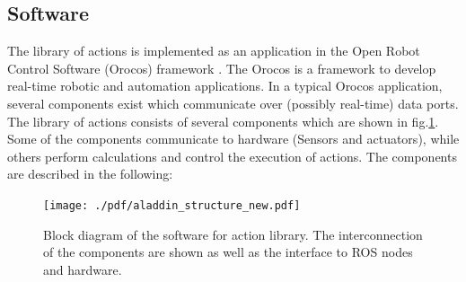 \subsection{Software}
\label{sec:software}
The library of actions is implemented as an application in the Open Robot Control Software (Orocos) framework \cite{rtt-url,soetens2006}.
The Orocos is a framework to develop real-time robotic and automation applications.
In a typical Orocos application, several components exist which communicate over (possibly real-time) data ports.
The library of actions consists of several components which are shown in fig.\ref{fig:aladdin_structure}.
Some of the components communicate to hardware (Sensors and actuators), while others perform calculations and control the execution of actions.
The components are described in the following:
\begin{figure}
      \centering
      \texttt{[image: ./pdf/aladdin\_structure\_new.pdf]}
      \caption{ Block diagram of the software for action library.
      The interconnection of the components are shown as well as the interface to ROS nodes and hardware.
}
      \label{fig:aladdin_structure}
\end{figure}



